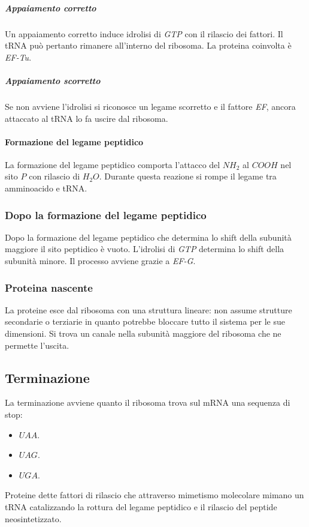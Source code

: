 				\subparagraph{Appaiamento corretto}
				Un appaiamento corretto induce idrolisi di \emph{GTP} con il rilascio dei fattori.
				Il tRNA pu\`o pertanto rimanere all'interno del ribosoma.
				La proteina coinvolta \`e \emph{EF-Tu}.
					
				\subparagraph{Appaiamento scorretto}
				Se non avviene l'idrolisi si riconosce un legame scorretto e il fattore \emph{EF}, ancora attaccato al tRNA lo fa uscire dal ribosoma.

			\paragraph{Formazione del legame peptidico}
			La formazione del legame peptidico comporta l'attacco del \emph{$NH_2$} al \emph{$COOH$} nel sito $P$ con rilascio di \emph{$H_2O$}.
			Durante questa reazione si rompe il legame tra amminoacido e tRNA.

		\subsubsection{Dopo la formazione del legame peptidico}
		Dopo la formazione del legame peptidico che determina lo shift della subunit\`a maggiore il sito peptidico \`e vuoto.
		L'idrolisi di \emph{GTP} determina lo shift della subunit\`a minore.
		Il processo avviene grazie a \emph{EF-G}.

		\subsubsection{Proteina nascente}
		La proteine esce dal ribosoma con una struttura lineare: non assume strutture secondarie o terziarie in quanto potrebbe bloccare tutto il sistema per le sue dimensioni.
		Si trova un canale nella subunit\`a maggiore del ribosoma che ne permette l'uscita.

	\subsection{Terminazione}
	La terminazione avviene quanto il ribosoma trova sul mRNA una sequenza di stop:
	\begin{multicols}{3}
		\begin{itemize}
			\item $UAA$.
			\item $UAG$.
			\item $UGA$.
		\end{itemize}
	\end{multicols}
	Proteine dette fattori di rilascio che attraverso mimetismo molecolare mimano un tRNA catalizzando la rottura del legame peptidico e il rilascio del peptide neosintetizzato.

